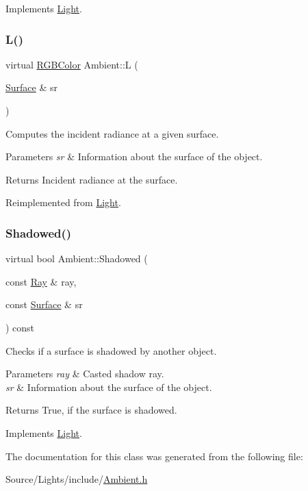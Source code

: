 Implements \hyperlink{class_light_a62c5f73131ca1cdd6b2477f36c242482}{Light}.

\hypertarget{class_ambient_aa75478ba2b30c9930ef538dd16f4586a}{}\label{class_ambient_aa75478ba2b30c9930ef538dd16f4586a} 
\subsubsection{\texorpdfstring{L()}{L()}}
{\footnotesize\ttfamily virtual \hyperlink{class_r_g_b_color}{R\+G\+B\+Color} Ambient\+::L (\begin{DoxyParamCaption}\item[{\hyperlink{class_surface}{Surface} \&}]{sr }\end{DoxyParamCaption})\hspace{0.3cm}{\ttfamily [virtual]}}

Computes the incident radiance at a given surface. 
\begin{DoxyParams}{Parameters}
{\em sr} & Information about the surface of the object. \\
\hline
\end{DoxyParams}
\begin{DoxyReturn}{Returns}
Incident radiance at the surface. 
\end{DoxyReturn}


Reimplemented from \hyperlink{class_light_aba4ca1dcd52876cb5bee71ac8f684af5}{Light}.

\hypertarget{class_ambient_a1373251f8db560b10061eb23f125bb27}{}\label{class_ambient_a1373251f8db560b10061eb23f125bb27} 
\subsubsection{\texorpdfstring{Shadowed()}{Shadowed()}}
{\footnotesize\ttfamily virtual bool Ambient\+::\+Shadowed (\begin{DoxyParamCaption}\item[{const \hyperlink{class_ray}{Ray} \&}]{ray,  }\item[{const \hyperlink{class_surface}{Surface} \&}]{sr }\end{DoxyParamCaption}) const\hspace{0.3cm}{\ttfamily [virtual]}}

Checks if a surface is shadowed by another object. 
\begin{DoxyParams}{Parameters}
{\em ray} & Casted shadow ray. \\
\hline
{\em sr} & Information about the surface of the object. \\
\hline
\end{DoxyParams}
\begin{DoxyReturn}{Returns}
True, if the surface is shadowed. 
\end{DoxyReturn}


Implements \hyperlink{class_light_ac96c5efcdccb339609c7d19ea6ac5d17}{Light}.



The documentation for this class was generated from the following file\+:\begin{DoxyCompactItemize}
\item 
Source/\+Lights/include/\hyperlink{_ambient_8h}{Ambient.\+h}\end{DoxyCompactItemize}
